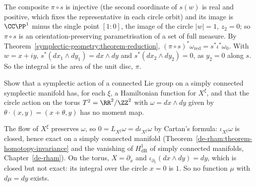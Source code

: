 \begin{solution}
The composite $\pi \circ s$ is injective (the second coordinate of $s(w)$ is real and positive, which fixes the representative in each circle orbit) and its image is $\CC\PP^1$ minus the single point $[1 : 0]$, the image of
the circle $|w| = 1$, $z_2 = 0$; so $\pi \circ s$ is an orientation-preserving parametrisation of a set of full measure. By Theorem~\ref{symplectic-geometry:theorem-reduction}, $(\pi \circ s)^*\omega_{\mathrm{red}} = s^*\iota^*\omega_0$.
With $w = x + iy$, $s^*(dx_1 \wedge dy_1) = dx \wedge dy$ and $s^*(dx_2 \wedge dy_2) = 0$, as $y_2 = 0$ along $s$. So the integral is the area of the unit disc, $\pi$.
\end{solution}

\begin{exercise}\label{symplectic-geometry:exercise-no-moment-map}
Show that a symplectic action of a connected Lie group on a simply connected symplectic manifold has, for each $\xi$, a Hamiltonian function for $X^\xi$, and that the circle action on the torus $T^2 = \RR^2/\ZZ^2$ with
$\omega = dx \wedge dy$ given by $\theta \cdot (x, y) = (x + \theta, y)$ has no moment map.
\end{exercise}

\begin{solution}
The flow of $X^\xi$ preserves $\omega$, so $0 = L_{X^\xi}\omega = d\iota_{X^\xi}\omega$ by Cartan's formula: $\iota_{X^\xi}\omega$ is closed, hence exact on a simply connected manifold
(Theorem~\ref{de-rham:theorem-homotopy-invariance} and the vanishing of $H^1_{\mathrm{dR}}$ of simply connected manifolds, Chapter~\ref{de-rham}). On the torus, $X = \partial_x$ and $\iota_{\partial_x}(dx \wedge dy) = dy$,
which is closed but not exact: its integral over the circle $x = 0$ is $1$. So no function $\mu$ with $d\mu = dy$ exists.
\end{solution}

